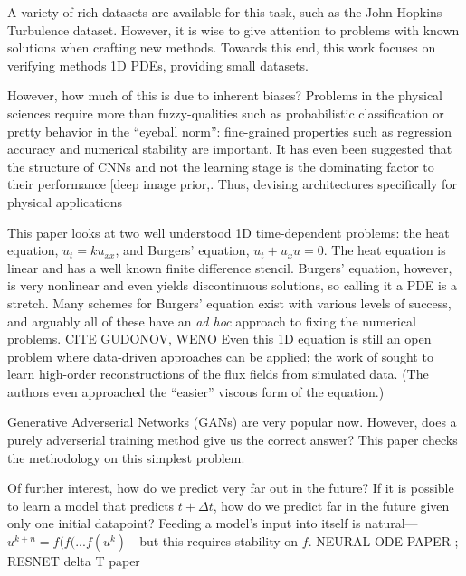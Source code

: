 \documentclass{article}
\begin{document}
A variety of rich datasets are available for this task, such as the
John Hopkins Turbulence dataset. However, it is wise to give attention
to problems with known solutions when crafting new methods. Towards
this end, this work focuses on verifying methods 1D PDEs, providing
small datasets.



However, how much of this is due to inherent biases? 
Problems in the physical sciences require more than fuzzy-qualities such as probabilistic classification or pretty behavior in the ``eyeball norm'': fine-grained properties such as regression accuracy and numerical stability are important.
It has even been suggested that the structure of CNNs and not the learning stage is the dominating factor to their performance [deep image prior,\cite{ulyanov_deep_2018,zador_critique_2019}. Thus, devising architectures specifically for physical applications 


This paper looks at two well understood 1D time-dependent problems:
the heat equation, $u_{t} = k u_{xx}$, 
and Burgers' equation,  $u_{t} + u_x u = 0$. The heat equation is linear and has a well
known finite difference stencil. Burgers' equation, however, is very
nonlinear and even yields discontinuous solutions, so calling it a PDE
is a stretch. Many schemes for Burgers' equation exist with various
levels of success, and arguably all of these have an {\em ad hoc}
approach to fixing the numerical problems. CITE GUDONOV, WENO
Even this 1D equation is still an open problem where data-driven
approaches can be applied; the work of
\cite{bar-sinai_data-driven_2018} sought to learn high-order
reconstructions of the flux fields from simulated data. (The authors even approached the ``easier''
viscous form of the equation.)

Generative Adverserial Networks (GANs) are very popular now. However,
does a purely adverserial training method give us the correct answer?
This paper checks the methodology on this simplest problem.


Of further interest, how do we predict very far out in the future? If
it is possible to learn a model that predicts $t+\Delta t$, how do we
predict far in the future given only one initial datapoint? Feeding a
model's input into itself is natural---$u^{k+n}=f(f(...f(u^k)$---but
this requires stability on $f$.
NEURAL ODE PAPER ; RESNET delta T paper
\end{document}
